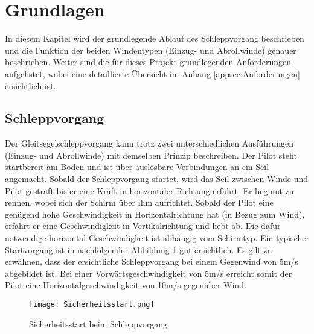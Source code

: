 \section{Grundlagen}\label{sec:Grundlagen}
In diesem Kapitel wird der grundlegende Ablauf des Schleppvorgang beschrieben und die Funktion der beiden Windentypen (Einzug- und Abrollwinde) genauer beschrieben. Weiter sind die für dieses Projekt grundlegenden Anforderungen aufgelistet, wobei eine detaillierte Übersicht im Anhang \ref{appsec:Anforderungen} ersichtlich ist.



\subsection{Schleppvorgang}\label{subsec:Schleppvorgang}
Der Gleitsegelschleppvorgang kann trotz zwei unterschiedlichen Ausführungen (Einzug- und Abrollwinde) mit demselben Prinzip beschreiben. Der Pilot steht startbereit am Boden und ist über auslösbare Verbindungen an ein Seil angemacht. Sobald der Schleppvorgang startet, wird das Seil zwischen Winde und Pilot gestraft bis er eine Kraft in horizontaler Richtung erfährt. Er beginnt zu rennen, wobei sich der Schirm über ihm aufrichtet. Sobald der Pilot eine genügend hohe Geschwindigkeit in Horizontalrichtung hat (in Bezug zum Wind), erfährt er eine Geschwindigkeit in Vertikalrichtung und hebt ab. Die dafür notwendige horizontal Geschwindigkeit ist abhängig vom Schirmtyp. Ein typischer Startvorgang ist in nachfolgender Abbildung \ref{fig:Sicherheitsstart} gut ersichtlich. Es gilt zu erwähnen, dass der ersichtliche Schleppvorgang bei einem Gegenwind von 5m/s abgebildet ist. Bei einer Vorwärtsgeschwindigkeit von 5m/s erreicht somit der Pilot eine Horizontalgeschwindigkeit von 10m/s gegenüber Wind.

\begin{figure}[H]
	\begin{center}
		\texttt{[image: Sicherheitsstart.png]}
		\caption{Sicherheitsstart beim Schleppvorgang \cite{Gleitsegelschlepp}}
		\label{fig:Sicherheitsstart}
	\end{center}
\end{figure}

